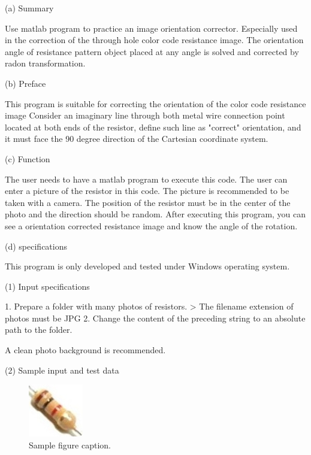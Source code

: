 \documentclass{article}
\begin{document}
(a) Summary

Use matlab program to practice an image orientation corrector.
Especially used in the correction of the through hole color code resistance image.
The orientation angle of resistance pattern object placed at any angle is solved and corrected by radon transformation.

(b) Preface

This program is suitable for correcting the orientation of the color code resistance image
Consider an imaginary line through both metal wire connection point located at both ends of the resistor, define such line as "correct" orientation, and it must face the 90 degree direction of the Cartesian coordinate system.

(c) Function

The user needs to have a matlab program to execute this code.
The user can enter a picture of the resistor in this code. The picture is recommended to be taken with a camera. The position of the resistor must be in the center of the photo and the direction should be random.
After executing this program, you can see a orientation corrected resistance image and know the angle of the rotation.

(d) specifications

This program is only developed and tested under Windows operating system.

(1) Input specifications


1. Prepare a folder with many photos of resistors.
> The filename extension of photos must be JPG
2. Change the content of the preceding string to an absolute path to the folder.

A clean photo background is recommended.

(2) Sample input and test data

\begin{figure}
	\centering
	\includegraphics[width=0.7\linewidth]{e5hIvV0.jpg}
	\caption{Sample figure caption.}
	\label{fig:e5hIvV0jpg}
\end{figure}
\end{document}
